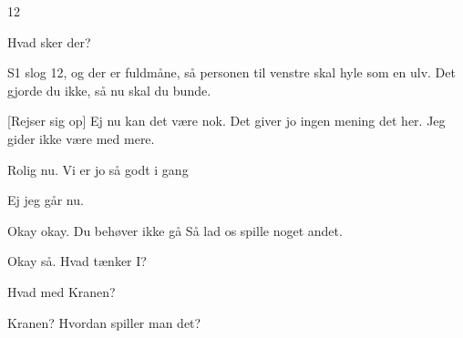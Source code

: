 \documentclass[a4paper,11pt]{article}
\begin{document}
\begin{sketch}

 12


 Hvad sker der?

 S1 slog 12, og der er fuldmåne, så personen til venstre skal hyle som en ulv. Det gjorde du ikke, så nu skal du bunde. 

[Rejser sig op] Ej nu kan det være nok. Det giver jo ingen mening det her. Jeg gider ikke være med mere. 

 Rolig nu. Vi er jo så godt i gang

 Ej jeg går nu. 


 Okay okay. Du behøver ikke gå Så lad os spille noget andet.

 Okay så. Hvad tænker I?

 Hvad med Kranen?

 Kranen? Hvordan spiller man det? 


\end{sketch}
\end{document}
